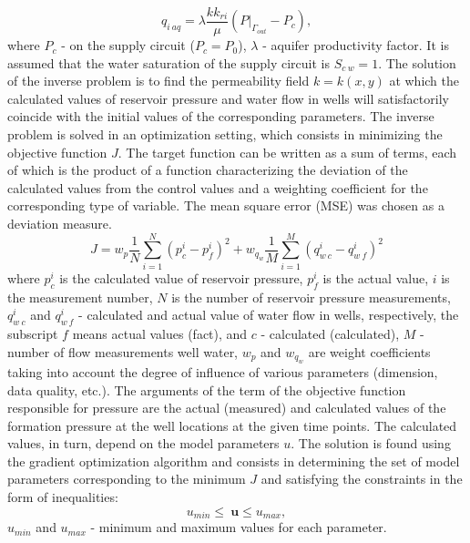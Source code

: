 \documentclass[
11pt,%
tightenlines,%
twoside,%
onecolumn,%
nofloats,%
nobibnotes,%
nofootinbib,%
superscriptaddress,%
noshowpacs,%
centertags]%
{revtex4}
\begin{document}
\begin{equation*} \label{qaq}
q_{i\:aq} = \lambda \frac{kk_{ri}}{\mu}(P|_{\Gamma_{out}}-P_c),
\end{equation*}
where $P_{c}$ - on the supply circuit ($P_c = P_0$), $\lambda$ - aquifer productivity factor. It is assumed that the water saturation of the supply circuit is $S_{c\:w} = 1$.
The solution of the inverse problem is to find the permeability field $k = k(x,y)$ at which the calculated values of reservoir pressure and water flow in wells will satisfactorily coincide with the initial values of the corresponding parameters. The inverse problem is solved in an optimization setting, which consists in minimizing the objective function $J$. The target function can be written as a sum of terms, each of which is the product of a function characterizing the deviation of the calculated values from the control values and a weighting coefficient for the corresponding type of variable. The mean square error (MSE) was chosen as a deviation measure.
\begin{equation} \label{mse}
	J=w_p\frac{1}{N}\sum_{i=1}^N{\left(p_c^i-p_f^i\right)^2}+w_{q_w}\frac{1}{M}\sum_{i=1}^M{\left(q_{w\:c}^i-q_{w\:f}^i\right)^2}
\end{equation}
where $p_c^i$ is the calculated value of reservoir pressure, $p_f^i$ is the actual value, $i$ is the measurement number, $N$ is the number of reservoir pressure measurements, $q_{w\:c}^i$ and $ q_{w\:f}^i$ - calculated and actual value of water flow in wells, respectively, the subscript $f$ means actual values (fact), and $c$ - calculated (calculated), $M$ - number of flow measurements well water, $w_p$ and $w_{q_w}$ are weight coefficients taking into account the degree of influence of various parameters (dimension, data quality, etc.). The arguments of the term of the objective function responsible for pressure are the actual (measured) and calculated values of the formation pressure at the well locations at the given time points.
 The calculated values, in turn, depend on the model parameters $u$. The solution is found using the gradient optimization algorithm and consists in determining the set of model parameters corresponding to the minimum $J$ and satisfying the constraints in the form of inequalities:
\begin{equation*}
u_{min}\leq\ \boldsymbol{u}\leq u_{max},
\end{equation*}
$u_{min}$ and $u_{max}$ - minimum and maximum values for each parameter.
\end{document}
